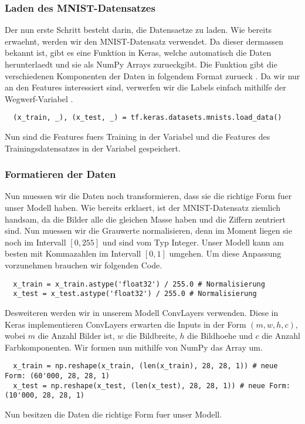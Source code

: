 \subsubsection{Laden des MNIST-Datensatzes}
Der nun erste Schritt besteht darin, die Datensaetze zu laden. Wie bereits
erwaehnt, werden wir den MNIST-Datensatz verwendet. Da dieser dermassen bekannt
ist, gibt es eine Funktion in Keras, welche automatisch die Daten herunterlaedt
und sie als NumPy Arrays zurueckgibt. Die Funktion gibt die verschiedenen
Komponenten der Daten in folgendem Format zurueck . Da wir nur an den Features  interessiert sind,
verwerfen wir die Labels  einfach mithilfe der Wegwerf-Variabel \code{\_}.
\begin{verbatim}
  (x_train, _), (x_test, _) = tf.keras.datasets.mnists.load_data()
\end{verbatim}
Nun sind die Features fuers Training in der Variabel  und die
Features des Trainingsdatensatzes in der Variabel  gespeichert.

\subsubsection{Formatieren der Daten}
Nun muessen wir die Daten noch transformieren, dass sie die richtige Form fuer
unser Modell haben. Wie bereits erklaert, ist der MNIST-Datensatz ziemlich
handsam, da die Bilder alle die gleichen Masse haben und die Ziffern zentriert sind.
\para{}
Nun muessen wir die Grauwerte normalisieren, denn im Moment liegen sie noch
im Intervall $[0, 255]$ und sind vom Typ Integer. Unser Modell kann am besten
mit Kommazahlen im Intervall $[0,1]$ umgehen. Um diese Anpassung vorzunehmen
brauchen wir folgenden Code.
\begin{verbatim}
  x_train = x_train.astype('float32') / 255.0 # Normalisierung
  x_test = x_test.astype('float32') / 255.0 # Normalisierung
\end{verbatim}
Desweiteren werden wir in unserem Modell ConvLayers verwenden. Diese in Keras
implementieren ConvLayers erwarten die Inputs in der Form $(m, w, h, c)$, wobei
$m$ die Anzahl Bilder ist, $w$ die Bildbreite, $h$ die Bildhoehe und $c$ die
Anzahl Farbkomponenten. Wir formen nun mithilfe von NumPy das Array um.
\begin{verbatim}
  x_train = np.reshape(x_train, (len(x_train), 28, 28, 1)) # neue Form: (60'000, 28, 28, 1)
  x_test = np.reshape(x_test, (len(x_test), 28, 28, 1)) # neue Form: (10'000, 28, 28, 1)
\end{verbatim}
Nun besitzen die Daten die richtige Form fuer unser Modell.

